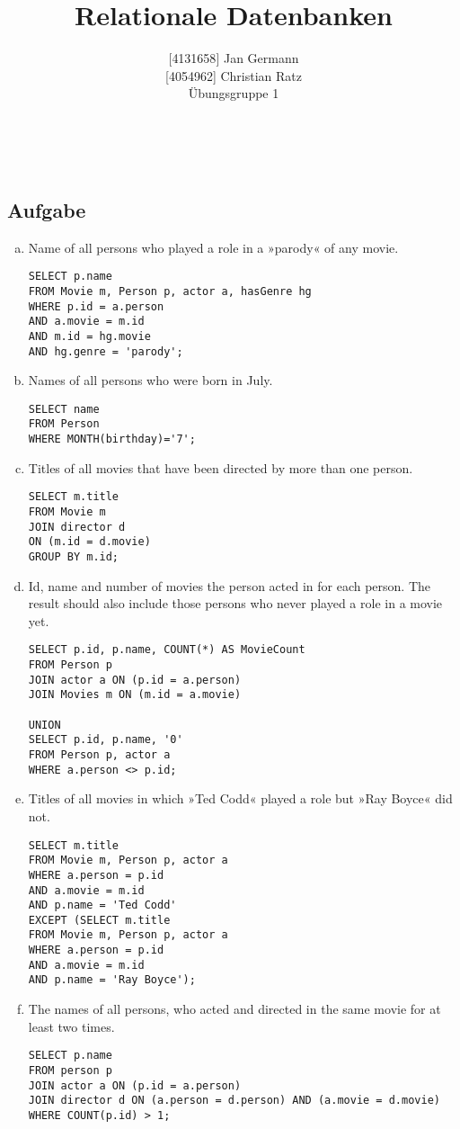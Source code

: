 \documentclass[11pt,a4paper,DIV=9]{scrartcl}
\author{{[}4131658{]} Jan Germann \\{[}4054962{]} Christian Ratz\\Übungsgruppe 1}
\title{Relationale Datenbanken}
\newcounter{temp}
\newcommand{\aufgabe}[1]{
  \setcounter{temp}{\value{subsection}}
  \setcounter{subsection}{#1}
  \addtocounter{subsection}{-1}
  \subsection{Aufgabe}
  \setcounter{subsection}{\value{temp}}
}
\renewcommand{\author}[1]{\renewcommand{\author}{#1}}
\renewcommand{\title}[1]{\renewcommand{\title}{#1}}
\newcommand{\makehomeworktitle}{
  \begin{minipage}[t]{6.5cm}
    \sf{\author}
  \end{minipage}
  \begin{minipage}[t]{6.5cm}
    \begin{flushright}
      \sf{\title\\\today}
    \end{flushright}
  \end{minipage}
  \\[0.2cm]
  \begin{center}
    \sf{
      \color{blue}{
        \LARGE{Aufgabenblatt \blattnr}
      }
    }
  \end{center}
  \vspace{0.1cm}
}
\begin{document}
\makehomeworktitle
\aufgabe{1}
  \begin{enumerate}[a.]
      \item Name of all persons who played a role in a »parody« of any movie.\hfill
\begin{lstlisting}
SELECT p.name
FROM Movie m, Person p, actor a, hasGenre hg
WHERE p.id = a.person
AND a.movie = m.id
AND m.id = hg.movie
AND hg.genre = 'parody';
\end{lstlisting}

      \item Names of all persons who were born in July.\hfill\\
\begin{lstlisting}
SELECT name 
FROM Person 
WHERE MONTH(birthday)='7';
\end{lstlisting}

      \item Titles of all movies that have been directed by more than one person.\hfill\\
\begin{lstlisting}
SELECT m.title 
FROM Movie m 
JOIN director d 
ON (m.id = d.movie) 
GROUP BY m.id; 
\end{lstlisting}


      \item Id, name and number of movies the person acted in for each person. The result should also include those persons who never played a role in a movie yet.\hfill
\begin{lstlisting}
SELECT p.id, p.name, COUNT(*) AS MovieCount 
FROM Person p 
JOIN actor a ON (p.id = a.person) 
JOIN Movies m ON (m.id = a.movie) 

UNION
SELECT p.id, p.name, '0' 
FROM Person p, actor a 
WHERE a.person <> p.id;
\end{lstlisting}


      \item Titles of all movies in which »Ted Codd« played a role but »Ray Boyce« did not.\hfill
\begin{lstlisting}
SELECT m.title 
FROM Movie m, Person p, actor a  
WHERE a.person = p.id 
AND a.movie = m.id 
AND p.name = 'Ted Codd' 
EXCEPT (SELECT m.title 
FROM Movie m, Person p, actor a 
WHERE a.person = p.id 
AND a.movie = m.id 
AND p.name = 'Ray Boyce');
\end{lstlisting}


      \item The names of all persons, who acted and directed in the same movie for at least two times.\hfill
\begin{lstlisting}
SELECT p.name 
FROM person p 
JOIN actor a ON (p.id = a.person) 
JOIN director d ON (a.person = d.person) AND (a.movie = d.movie) 
WHERE COUNT(p.id) > 1;
\end{lstlisting}
 


\end{enumerate}
\end{document}
